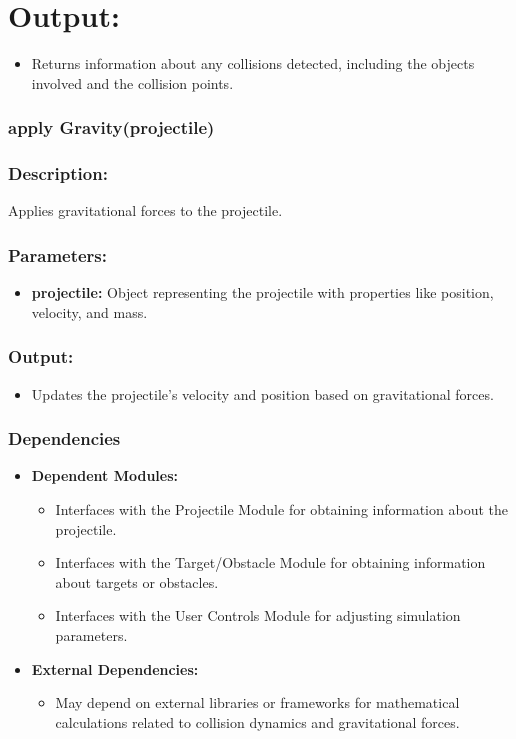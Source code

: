 \documentclass[12pt, titlepage]{article}
\begin{document}
\section*{Output:}
\begin{itemize}
  \item Returns information about any collisions detected, including the objects involved and the collision points.
\end{itemize}

\subsubsection*{apply Gravity(projectile)}

\subsubsection*{Description:} Applies gravitational forces to the projectile.

\subsubsection*{Parameters:}

\begin{itemize}
  \item \textbf{projectile:} Object representing the projectile with properties like position, velocity, and mass.
\end{itemize}

\subsubsection*{Output:}
\begin{itemize}
  \item Updates the projectile's velocity and position based on gravitational forces.
\end{itemize}

\subsubsection{Dependencies}
\begin{itemize}
  \item \textbf{Dependent Modules:}
    \begin{itemize}
         \item Interfaces with the Projectile Module for obtaining information about the projectile.
        \item Interfaces with the Target/Obstacle Module for obtaining information about targets or obstacles.
        \item Interfaces with the User Controls Module for adjusting simulation parameters.
  \end{itemize}

\item \textbf{External Dependencies:}
\begin{itemize}
  \item May depend on external libraries or frameworks for mathematical calculations related to collision dynamics and gravitational forces.
\end{itemize}
\end{itemize}
\end{document}
